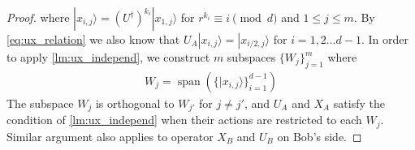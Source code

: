 \documentclass[11pt,letterpaper]{article}
\newcommand{\ket}[1]{|#1\rangle}
\newcommand{\ketbra}[2]{|#1\rangle\langle#2|}
\newcommand{\ct}{^{\dagger}}
\DeclareMathOperator{\spn}{span}
\DeclareMathOperator{\supp}{supp}
\newcommand{\1}{\mathbb{1}}
\theoremstyle{definition}
\begin{document}
\begin{proof}
where $\ket{x_{i,j}} = (U\ct)^{k_i} \ket{x_{1,j}}$ for $r^{k_i} \equiv i \pmod{d}$ and $1 \leq j \leq m$.
By \cref{eq:ux_relation} we also know that $U_A \ket{x_{i,j}} = \ket{x_{i/2,j}}$ for $i = 1,2 \dots d-1$.
In order to apply \cref{lm:ux_independ}, we construct $m$ subspaces $\{W_j\}_{j=1}^m$ where 
\begin{align}
	W_j = \spn( \{ \ket{x_{i,j}} \}_{i=1}^{d-1} )
\end{align}
The subspace $W_j$ is orthogonal to $W_{j'}$ for $j \neq j'$, and
$U_A$ and $X_A$ satisfy the condition of \cref{lm:ux_independ} when their actions are 
restricted to each $W_j$.
Similar argument also applies to operator $X_B$ and $U_B$ on Bob's side.




\end{proof}
\end{document}
